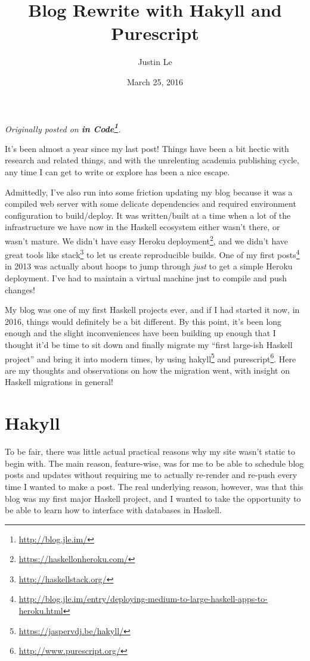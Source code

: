 \documentclass[]{article}
\title{Blog Rewrite with Hakyll and Purescript}
\author{Justin Le}
\date{March 25, 2016}
\renewcommand{\href}[2]{#2\footnote{\url{#1}}}
\begin{document}
\maketitle

\emph{Originally posted on \textbf{\href{http://blog.jle.im/}{in
Code}}.}

It's been almost a year since my last post! Things have been a bit
hectic with research and related things, and with the unrelenting
academia publishing cycle, any time I can get to write or explore has
been a nice escape.

Admittedly, I've also run into some friction updating my blog because it
was a compiled web server with some delicate dependencies and required
environment configuration to build/deploy. It was written/built at a
time when a lot of the infrastructure we have now in the Haskell
ecosystem either wasn't there, or wasn't mature. We didn't have easy
\href{https://haskellonheroku.com/}{Heroku deployment}, and we didn't
have great tools like \href{http://haskellstack.org/}{stack} to let us
create reproducible builds. One of my
\href{http://blog.jle.im/entry/deploying-medium-to-large-haskell-apps-to-heroku.html}{first
posts} in 2013 was actually about hoops to jump through \emph{just} to
get a simple Heroku deployment. I've had to maintain a virtual machine
just to compile and push changes!

My blog was one of my first Haskell projects ever, and if I had started
it now, in 2016, things would definitely be a bit different. By this
point, it's been long enough and the slight inconveniences have been
building up enough that I thought it'd be time to sit down and finally
migrate my ``first large-ish Haskell project'' and bring it into modern
times, by using \href{https://jaspervdj.be/hakyll/}{hakyll} and
\href{http://www.purescript.org/}{purescript}. Here are my thoughts and
observations on how the migration went, with insight on Haskell
migrations in general!

\section{Hakyll}\label{hakyll}

To be fair, there was little actual practical reasons why my site wasn't
static to begin with. The main reason, feature-wise, was for me to be
able to schedule blog posts and updates without requiring me to actually
re-render and re-push every time I wanted to make a post. The real
underlying reason, however, was that this blog was my first major
Haskell project, and I wanted to take the opportunity to be able to
learn how to interface with databases in Haskell.
\end{document}
